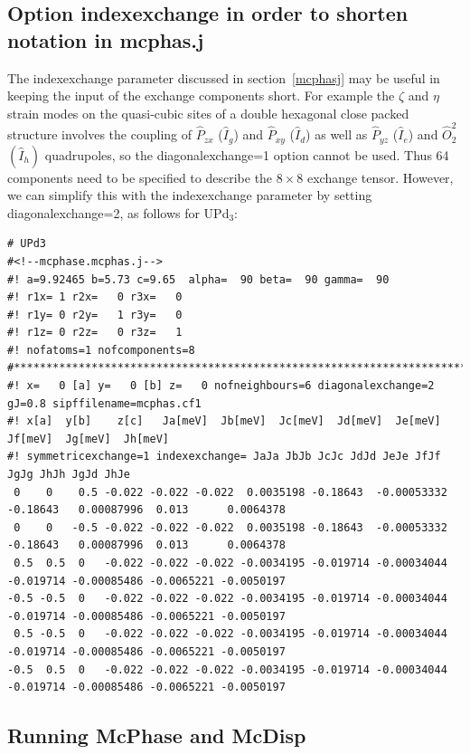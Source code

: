 \subsection{Option {\prg indexexchange} in order to shorten notation in {\prg mcphas.j}}
The {\prg indexexchange} parameter discussed in section~\ref{mcphasj} may be useful in keeping the input
of the exchange components short. For example the $\zeta$ and $\eta$ strain modes on the quasi-cubic sites
of a double hexagonal close packed structure involves the coupling of $\hat P_{zx}$ ($\hat I_g$) and $\hat P_{xy}$ ($\hat I_d$) 
as well as $\hat P_{yz}$ ($\hat I_e$) and $\hat O_2^2$ $(\hat I_h)$ quadrupoles, so the {\prg diagonalexchange=1} option 
cannot be used. Thus 64 components need to be specified to describe the $8\times 8$ exchange tensor. 
However, we can simplify this with the {\prg indexexchange} parameter by setting {\prg diagonalexchange=2}, 
as follows for UPd$_3$:

{\footnotesize \begin{verbatim}
# UPd3 
#<!--mcphase.mcphas.j-->
#! a=9.92465 b=5.73 c=9.65  alpha=  90 beta=  90 gamma=  90
#! r1x= 1 r2x=   0 r3x=   0
#! r1y= 0 r2y=   1 r3y=   0
#! r1z= 0 r2z=   0 r3z=   1
#! nofatoms=1 nofcomponents=8
#*************************************************************************
#! x=   0 [a] y=   0 [b] z=   0 nofneighbours=6 diagonalexchange=2 gJ=0.8 sipffilename=mcphas.cf1
#! x[a]  y[b]    z[c]   Ja[meV]  Jb[meV]  Jc[meV]  Jd[meV]  Je[meV]  Jf[meV]  Jg[meV]  Jh[meV]
#! symmetricexchange=1 indexexchange= JaJa JbJb JcJc JdJd JeJe JfJf JgJg JhJh JgJd JhJe
 0    0    0.5 -0.022 -0.022 -0.022  0.0035198 -0.18643  -0.00053332 -0.18643   0.00087996  0.013      0.0064378
 0    0   -0.5 -0.022 -0.022 -0.022  0.0035198 -0.18643  -0.00053332 -0.18643   0.00087996  0.013      0.0064378
 0.5  0.5  0   -0.022 -0.022 -0.022 -0.0034195 -0.019714 -0.00034044 -0.019714 -0.00085486 -0.0065221 -0.0050197
-0.5 -0.5  0   -0.022 -0.022 -0.022 -0.0034195 -0.019714 -0.00034044 -0.019714 -0.00085486 -0.0065221 -0.0050197
 0.5 -0.5  0   -0.022 -0.022 -0.022 -0.0034195 -0.019714 -0.00034044 -0.019714 -0.00085486 -0.0065221 -0.0050197
-0.5  0.5  0   -0.022 -0.022 -0.022 -0.0034195 -0.019714 -0.00034044 -0.019714 -0.00085486 -0.0065221 -0.0050197
\end{verbatim} }



\subsection{Running {\prg McPhase} and {\prg McDisp}}


